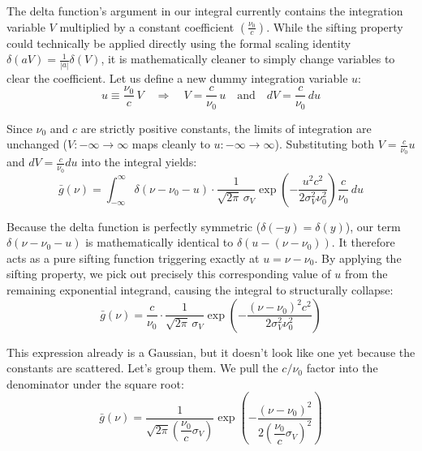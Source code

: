 The delta function's argument in our integral currently contains the integration variable $V$ multiplied by a constant coefficient $\left(\frac{\nu_0}{c}\right)$. While the sifting property could technically be applied directly using the formal scaling identity $\delta(aV) = \frac{1}{|a|}\delta(V)$, it is mathematically cleaner to simply change variables to clear the coefficient. Let us define a new dummy integration variable $u$:
\begin{equation*}
    u \equiv \frac{\nu_0}{c}\,V \quad\Longrightarrow\quad V = \frac{c}{\nu_0}\,u \quad\text{and}\quad dV = \frac{c}{\nu_0}\,du
\end{equation*}

Since $\nu_0$ and $c$ are strictly positive constants, the limits of integration are unchanged ($V: -\infty \to \infty$ maps cleanly to $u: -\infty \to \infty$). Substituting both $V = \frac{c}{\nu_0}u$ and $dV = \frac{c}{\nu_0}du$ into the integral yields:
\begin{equation*}
    \bar{g}(\nu)
    = \int_{-\infty}^{\infty} \delta(\nu - \nu_0 - u)
    \cdot \frac{1}{\sqrt{2\pi}\,\sigma_V}\exp\!\left(-\frac{u^2 c^2}{2\sigma_V^2\nu_0^2}\right) \frac{c}{\nu_0}\,du
\end{equation*}

Because the delta function is perfectly symmetric ($\delta(-y) = \delta(y)$), our term $\delta(\nu - \nu_0 - u)$ is mathematically identical to $\delta(u - (\nu - \nu_0))$. It therefore acts as a pure sifting function triggering exactly at $u = \nu - \nu_0$. By applying the sifting property, we pick out precisely this corresponding value of $u$ from the remaining exponential integrand, causing the integral to structurally collapse:
\begin{equation*}
    \bar{g}(\nu) = \frac{c}{\nu_0} \cdot \frac{1}{\sqrt{2\pi}\,\sigma_V}\exp\!\left(-\frac{(\nu-\nu_0)^2 c^2}{2\sigma_V^2\nu_0^2}\right)
\end{equation*}

This expression already is a Gaussian, but it doesn't look like one yet because the constants are scattered. Let's group them. We pull the $c/\nu_0$ factor into the denominator under the square root:
\begin{equation*}
    \bar{g}(\nu)
    = \frac{1}{\sqrt{2\pi}\!\left(\dfrac{\nu_0}{c}\sigma_V\right)}
    \exp\!\left(-\frac{(\nu-\nu_0)^2}{2\!\left(\dfrac{\nu_0}{c}\sigma_V\right)^2}\right)
\end{equation*}

